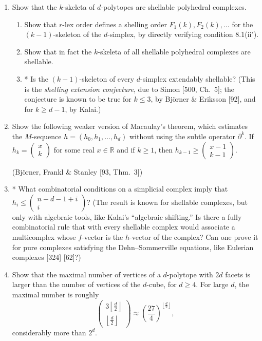 \documentclass{article}
\begin{document}
\begin{enumerate}
\item Show that the $k$-skeleta of $d$-polytopes are shellable polyhedral complexes.

\begin{enumerate}[label=(\roman*)]
\item Show that $r$-lex order defines a shelling order $F_1(k),F_2(k),\dots$ for the $(k-1)$-skeleton of the $d$-simplex, by directly verifying condition 8.1(ii$'$).
\item Show that in fact the $k$-skeleta of all shellable polyhedral complexes are shellable.
\item * Is the $(k-1)$-skeleton of every $d$-simplex extendably shellable? (This is the \emph{shelling extension conjecture}, due to Simon [500, Ch.~5]; the conjecture is known to be true for $k\le 3$, by Bj\"orner \& Eriksson [92], and for $k\ge d-1$, by Kalai.)
\end{enumerate}

\item Show the following weaker version of Macaulay's theorem, which estimates the $M$-sequence $h=(h_0,h_1,\dots,h_d)$ without using the subtle operator $\partial^k$. If $h_k=\begin{pmatrix} x \\ k \end{pmatrix}$ for some real $x\in \mathbb{R}$ and if $k\ge 1$, then $h_{k-1}\ge \begin{pmatrix} x-1 \\ k-1 \end{pmatrix}$. 

(Bj\"orner, Frankl \& Stanley [93, Thm.~3])

\item* What combinatorial conditions on a simplicial complex imply that $h_i \le \begin{pmatrix} n-d-1+i \\ i \end{pmatrix}$? (The result is known for shellable complexes, but only with algebraic tools, like Kalai's ``algebraic shifting.'' Is there a fully combinatorial rule that with every shellable complex would associate a multicomplex whose $f$-vector is the $h$-vector of the complex? Can one prove it for pure complexes satisfying the Dehn--Sommerville equations, like Eulerian complexes [324] [62]?)

\item Show that the maximal number of vertices of a $d$-polytope with $2d$ facets is larger than the number of vertices of the $d$-cube, for $d\ge 4$. For large $d$, the maximal number is roughly
\[
\begin{pmatrix}
3\left\lfloor \frac{d}{2}\right\rfloor\\
\left\lfloor \frac{d}{2}\right\rfloor
\end{pmatrix}
\approx
\left(\frac{27}{4}\right)^{\left\lfloor \frac{d}{2}\right\rfloor},
\]
considerably more than $2^d$.


\end{enumerate}
\end{document}
